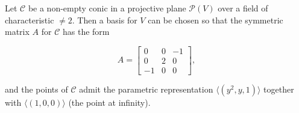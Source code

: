 Let $\mathcal{C}$ be a non-empty conic in a projective plane $\mathcal{P}(V)$ over a field of characteristic $\neq 2$. Then a basis for $V$ can be chosen so that the symmetric matrix $A$ for $\mathcal{C}$ has the form

$$A = \begin{bmatrix} 0 & 0 & -1 \\ 0 & 2 & 0 \\ -1 & 0 & 0 \end{bmatrix},$$

and the points of $\mathcal{C}$ admit the parametric representation $\langle (y^2, y, 1) \rangle$ together with $\langle (1, 0, 0) \rangle$ (the point at infinity).
